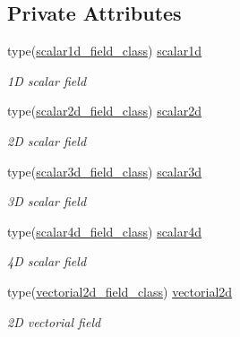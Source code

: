 \subsection*{Private Attributes}
\begin{DoxyCompactItemize}
\item 
type(\mbox{\hyperlink{structfield__types__mod_1_1scalar1d__field__class}{scalar1d\+\_\+field\+\_\+class}}) \mbox{\hyperlink{structfield__types__mod_1_1generic__field__class_ae3185284dd0108eb061a00bac8c51751}{scalar1d}}
\begin{DoxyCompactList}\small\item\em 1D scalar field \end{DoxyCompactList}\item 
type(\mbox{\hyperlink{structfield__types__mod_1_1scalar2d__field__class}{scalar2d\+\_\+field\+\_\+class}}) \mbox{\hyperlink{structfield__types__mod_1_1generic__field__class_a0cd8726f70f58313d1920e35595cfe45}{scalar2d}}
\begin{DoxyCompactList}\small\item\em 2D scalar field \end{DoxyCompactList}\item 
type(\mbox{\hyperlink{structfield__types__mod_1_1scalar3d__field__class}{scalar3d\+\_\+field\+\_\+class}}) \mbox{\hyperlink{structfield__types__mod_1_1generic__field__class_af45704b3cbbf0877a4f4f8cba1733a20}{scalar3d}}
\begin{DoxyCompactList}\small\item\em 3D scalar field \end{DoxyCompactList}\item 
type(\mbox{\hyperlink{structfield__types__mod_1_1scalar4d__field__class}{scalar4d\+\_\+field\+\_\+class}}) \mbox{\hyperlink{structfield__types__mod_1_1generic__field__class_a699e81600f0d0261f0da0e986be51a40}{scalar4d}}
\begin{DoxyCompactList}\small\item\em 4D scalar field \end{DoxyCompactList}\item 
type(\mbox{\hyperlink{structfield__types__mod_1_1vectorial2d__field__class}{vectorial2d\+\_\+field\+\_\+class}}) \mbox{\hyperlink{structfield__types__mod_1_1generic__field__class_acb71604f43668ee0bf8990008f9db323}{vectorial2d}}
\begin{DoxyCompactList}\small\item\em 2D vectorial field \end{DoxyCompactList}\item 

\end{DoxyCompactItemize}
